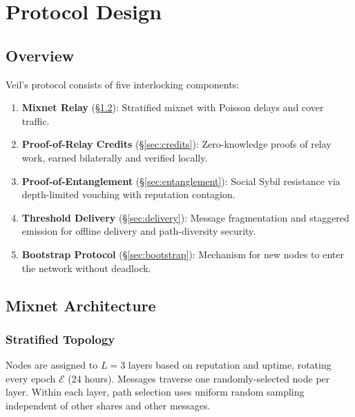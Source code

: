 \documentclass[11pt,a4paper]{article}
\begin{document}

\section{Protocol Design}
\label{sec:protocol}

\subsection{Overview}

Veil's protocol consists of five interlocking components:

\begin{enumerate}[nosep]
    \item \textbf{Mixnet Relay} (\S\ref{sec:mixnet}): Stratified mixnet with Poisson delays and cover traffic.
    \item \textbf{Proof-of-Relay Credits} (\S\ref{sec:credits}): Zero-knowledge proofs of relay work, earned bilaterally and verified locally.
    \item \textbf{Proof-of-Entanglement} (\S\ref{sec:entanglement}): Social Sybil resistance via depth-limited vouching with reputation contagion.
    \item \textbf{Threshold Delivery} (\S\ref{sec:delivery}): Message fragmentation and staggered emission for offline delivery and path-diversity security.
    \item \textbf{Bootstrap Protocol} (\S\ref{sec:bootstrap}): Mechanism for new nodes to enter the network without deadlock.
\end{enumerate}

\subsection{Mixnet Architecture}
\label{sec:mixnet}

\subsubsection{Stratified Topology}

Nodes are assigned to $L = 3$ layers based on reputation and uptime, rotating every epoch $\mathcal{E}$ (24 hours). Messages traverse one randomly-selected node per layer. Within each layer, path selection uses uniform random sampling independent of other shares and other messages.
\end{document}
